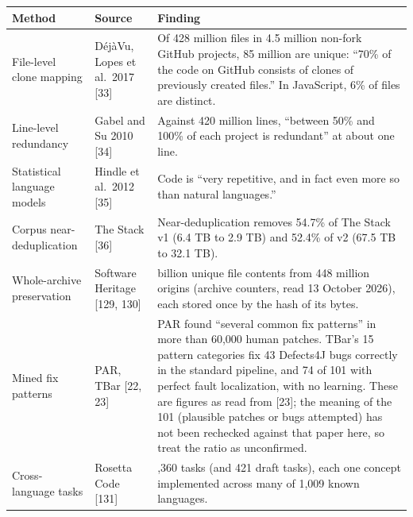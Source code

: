 \documentclass[10pt,letterpaper]{article}
\newcounter{none}
\begin{document}
{\def\LTcaptype{none} %
{\footnotesize\setlength{\tabcolsep}{3.8pt}\renewcommand{\arraystretch}{1.15}
\begin{longtable}[]{@{}
  >{\raggedright\arraybackslash}p{}
  >{\raggedright\arraybackslash}p{}
  >{\raggedright\arraybackslash}p{}@{}}
\toprule\noalign{}
\begin{minipage}[b]{\linewidth}\raggedright
\textbf{Method}
\end{minipage} & \begin{minipage}[b]{\linewidth}\raggedright
\textbf{Source}
\end{minipage} & \begin{minipage}[b]{\linewidth}\raggedright
\textbf{Finding}
\end{minipage} \\
\midrule\noalign{}
\endhead
\bottomrule\noalign{}
\endlastfoot
File-level clone mapping & DéjàVu, Lopes et al.~2017 {[}33{]} & Of 428
million files in 4.5 million non-fork GitHub projects, 85 million are
unique: ``70\% of the code on GitHub consists of clones of previously
created files.'' In JavaScript, 6\% of files are distinct. \\
Line-level redundancy & Gabel and Su 2010 {[}34{]} & Against 420 million
lines, ``between 50\% and 100\% of each project is redundant'' at about
one line. \\
Statistical language models & Hindle et al.~2012 {[}35{]} & Code is
``very repetitive, and in fact even more so than natural languages.'' \\
Corpus near-deduplication & The Stack {[}36{]} & Near-deduplication
removes 54.7\% of The Stack v1 (6.4 TB to 2.9 TB) and 52.4\% of v2 (67.5
TB to 32.1 TB). \\
Whole-archive preservation & Software Heritage {[}129, 130{]} & 30.3
billion unique file contents from 448 million origins (archive counters,
read 13 October 2026), each stored once by the hash of its bytes. \\
Mined fix patterns & PAR, TBar {[}22, 23{]} & PAR found ``several common
fix patterns'' in more than 60,000 human patches. TBar's 15 pattern
categories fix 43 Defects4J bugs correctly in the standard pipeline, and
74 of 101 with perfect fault localization, with no learning. These are
figures as read from {[}23{]}; the meaning of the 101 (plausible patches
or bugs attempted) has not been rechecked against that paper here, so
treat the ratio as unconfirmed. \\
Cross-language tasks & Rosetta Code {[}131{]} & 1,360 tasks (and 421
draft tasks), each one concept implemented across many of 1,009 known
languages. \\
\end{longtable}
}
}
\end{document}
